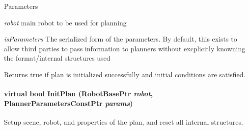 \begin{DoxyParams}{Parameters}
\item[{\em robot}]main robot to be used for planning \item[{\em isParameters}]The serialized form of the parameters. By default, this exists to allow third parties to pass information to planners without excplicitly knowning the format/internal structures used \end{DoxyParams}
\begin{DoxyReturn}{Returns}
true if plan is initialized successfully and initial conditions are satisfied. 
\end{DoxyReturn}
\hypertarget{classOpenRAVE_1_1PlannerBase_a109c37d3de7ee99f93c740a2df0e5e34}{
\paragraph[{InitPlan}]{\setlength{\rightskip}{0pt plus 5cm}virtual bool InitPlan (RobotBasePtr {\em robot}, \/  PlannerParametersConstPtr {\em params})}\hfill}
\label{classOpenRAVE_1_1PlannerBase_a109c37d3de7ee99f93c740a2df0e5e34}


Setup scene, robot, and properties of the plan, and reset all internal structures. 


